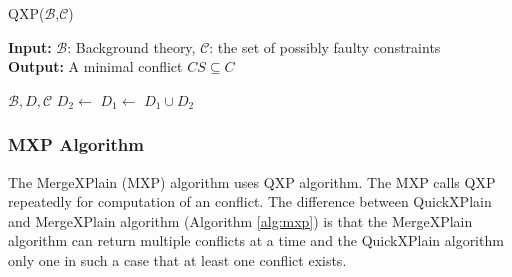 \documentclass[12pt,a4paper]{article}
\begin{document}
\begin{algorithm}[H]
	\footnotesize
	\caption{QXP($\mathcal{B}$,$\mathcal{C}$)}
	\label{alg:qxp}
	\textbf{Input:} $\mathcal{B}$: Background theory, $\mathcal{C}$: the set of possibly faulty constraints  \\
	\textbf{Output:} A minimal conflict $CS \subseteq C$
	\begin{algorithmic}[1]
		\State {}
		\State \Return {$\emptyset$}
		\EndIf
		\State \Return {}
		
		\medskip
		 {$\mathcal{B}, D, \mathcal{C}$}
		\State \Return {$\emptyset$}
		\EndIf
		\State {}
		\EndIf
		\State $D_{2} \gets$ 
		\State $D_{1} \gets$ 
		\State \Return $D_{1} \cup D_{2}$
		\EndFunction			
	\end{algorithmic}
\end{algorithm}

\subsubsection{MXP Algorithm}
The MergeXPlain (MXP) algorithm uses QXP algorithm. The MXP calls QXP repeatedly for computation of an conflict. The difference between QuickXPlain and MergeXPlain algorithm (Algorithm \ref{alg:mxp}) is that the MergeXPlain algorithm can return multiple conflicts at a time and the QuickXPlain algorithm only one in such a case that at least one conflict exists. 
\end{document}
